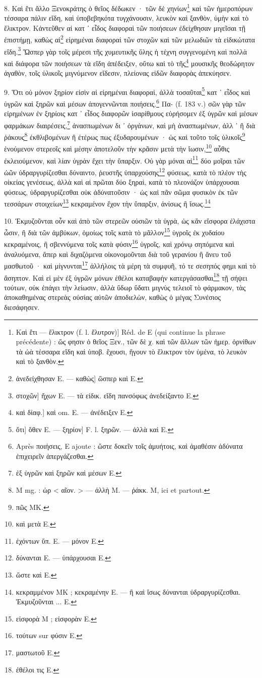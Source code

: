 \documentclass[a4paper, 11pt, oneside, polutonikogreek, french]{article}
\begin{document}
8. Καὶ ἔτι ἄλλο Ξενοκράτης ὁ θεῖος δέδωκεν · τῶν δὲ χηνίων\footnote{Kαὶ ἔτι --- ἔλικτρον (f. l. ἔλυτρον)] Réd. de E (qui continue la phrase précédente) : ὥς φησιν ὁ θεῖος Ξεν., τῶν δὲ χ. καὶ τῶν ἄλλων τῶν ἡμερ. ὀρνίθων τὰ ὠὰ τέσσαρα εἴδη καὶ ὑποβ. ἔχουσι, ἤγουν τὸ ἔλικτρον τὸν ὑμένα, τὸ λευκὸν καὶ τὸ ξανθὸν.} καὶ τῶν ἡμεροπόρων τέσσαρα πάλιν εἴδη, καὶ ὑποβεβηκότα τυγχάνουσιν, λευκὸν καὶ ξανθὸν, ὑμὴν καὶ τὸ ἔλικτρον. Κἀντεῦθεν αἱ κατ ᾽ εἶδος διαφοραὶ τῶν ποιήσεων ἐδείχθησαν μιγεῖσαι τῇ ἐπιστήμῃ, καθὼς αἱ\footnote{ἀνεδείχθησαν E. --- καθὼς] ὥσπερ καὶ E.} εἰρημέναι διαφοραὶ τῶν στοχῶν καὶ τῶν μελωδιῶν τὰ εἰδικώτατα εἴδη.\footnote{στοχῶν] ἤχων E. --- τὰ εἰδικ. εἴδη πανσόφως ἀνεδείξαντο E.} Ὥσπερ γὰρ τοῖς μέρεσι τῆς χυμευτικῆς ὕλης ἡ τέχνη συγγενομένη καὶ πολλὰ καὶ διάφορα τῶν ποιήσεων τὰ εἴδη ἀπέδειξεν, οὕτω καὶ τὸ τῆς\footnote{καὶ δίαφ.] καὶ om. E. --- ἀνέδειξεν E.} μουσικῆς θεοδώρητον ἀγαθὸν, τοῖς ὑλικοῖς μιγνύμενον εἴδεσιν, πλείονας εἰδῶν διαφορὰς ἀπεκύησεν.

9. Ὅτι οὐ μόνον ξηρίον εἰσὶν αἱ εἰρημέναι διαφοραὶ, ἀλλὰ τοσαῦται\footnote{ὅτι] ὅθεν E. --- ξηρίον] F. l. ξηρῶν. --- ἀλλὰ καὶ E.} κατ ᾽ εἶδος καὶ ὑγρῶν καὶ ξηρῶν καὶ μέσων ἀπογεννῶνται ποιήσεις.\footnote{Après ποιήσεις, E ajoute : ὥστε δοκεῖν τοῖς ἀμυήτοις, καὶ ἀμαθέσιν ἀδύνατα ἐπιχειρεῖν ἀπεργάζεσθαι.} Πα- (f. 183 v.) σῶν γὰρ τῶν εἰρημένων ἐν ξηρίοις κατ ᾽ εἶδος διαφορῶν ἰσαρίθμους εὑρήσομεν ἐξ ὑγρῶν καὶ μέσων φαρμάκων διαιρέσεις,\footnote{ἐξ ὑγρῶν καὶ ξηρῶν καὶ μέσων E.} ἀνασπωμένων δι ᾽ ὀργάνων, καὶ μὴ ἀνασπωμένων, ἀλλ ᾽ ἢ διὰ ῥάκους\footnote{M mg. : ὡρ < αῖον. > --- ἀλλὴ M. --- ῥάκκ. M, ici et partout.} ἐκθλιβομένων ἢ ἐτέρως πως ἐξυδαρουμένων · ὡς καὶ τοῦτο τοῖς ὑλικοῖς\footnote{πῶς MK.} ἑνούμενον στερεοῖς καὶ μέσην ἀποτελοῦν τὴν κρᾶσιν μετὰ τὴν ἴωσιν,\footnote{καὶ μετὰ E.} αὖθις ἐκλειούμενον, καὶ λίαν ὑγρὰν ἔχει τὴν ὕπαρξιν. Οὐ γὰρ μόναι αἱ\footnote{ἐχόντων ὕπ. E. --- μόνον E.} δύο μοῖραι τῶν ὠῶν ὑδραργυρίζεσθαι δύναιντο, ῥευστῆς ὑπαρχούσης\footnote{δύνανται E. --- ὑπάρχουσαι E.} φύσεως, κατὰ τὸ πλέον τὴς οἰκείας γενέσεως, ἀλλὰ καὶ αἱ πρῶται δύο ξηραὶ, κατὰ τὸ πλεονάζον ὑπάρχουσαι φύσεως, ὑδραργυρίζεσθαι οὐκ ἀδύνατοῦσιν · ὡς καὶ πᾶν σῶμα φυσικὸν ἐκ τῶν τεσσάρων στοιχείων\footnote{ὥστε καὶ E.} κεκραμένον ἔχον τὴν ὕπαρξιν, ἀνίσως ἢ ἴσως.\footnote{κεκραμμένον MK ; κεκραμένην E. --- ἢ καὶ ἴσως δύνανται ὑδραργυρίζεσθαι. Ἐκμυζοῦνται ... E.}

10. Ἐκμυζοῦνται οὖν καὶ ἀπὸ τῶν στερεῶν οὐσιῶν τὰ ὑγρὰ, ὡς κἂν εἴσφορα ἐλάχιστα ὦσιν, ἢ διὰ τῶν ἀμβύκων, ὁμοίως τοῖς κατὰ τὸ μᾶλλον\footnote{εἰσφορὰ M ; εἰσφορὰν E.} ὑγροῖς ἐκ χυδαίου κεκραμένοις, ἢ σβεννύμενα τοῖς κατὰ φύσιν\footnote{τούτων sur φύσιν E.} ὑγροῖς, καὶ χρόνῳ σηπόμενα καὶ ἀναλυόμενα, ἅπερ καὶ διχαζόμενα οἰκονομοῦνται διὰ τοῦ γερανίου ἢ ἄνευ τοῦ μασθωτοῦ · καὶ μίγνυνται\footnote{μαστωτοῦ E.} ἀλλήλοις τὰ μέρη τὰ συμφυῆ, τό τε σεσηπός φημι καὶ τὸ ἄσηπτον. Καὶ εἰ μὲν ἐξ ὑγρῶν μόνων ἐθέλοι καταβαφὴν κατεργάσασθαι\footnote{ἐθέλοι τις E.} τῇ σήψει τούτων, οὐκ ἐπάγει τὴν λείωσιν, ἀλλὰ ὕδωρ ὕδατι μιγνὺς τελειοῖ τὸ φάρμακον, τὰς ἀποκαθημένας στερεὰς οὐσίας αὐτῶν ἀποδιελὼν, καθὼς ὁ μέγας Συνέσιος διεσάφησεν.
\end{document}
